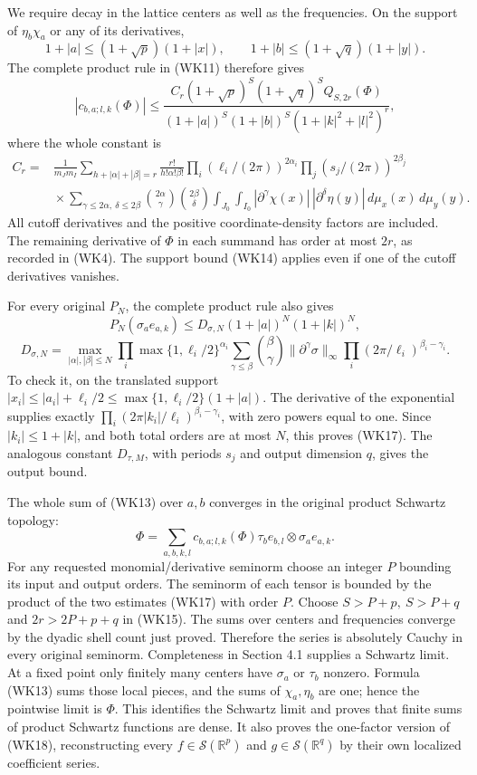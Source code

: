 \documentclass[
  11pt,
]{article}
\begin{document}
We require decay in the lattice centers as well as the frequencies. On
the support of \(\eta_b\chi_a\) or any of its derivatives, \[
 1+|a|\leq(1+\sqrt p)(1+|x|),\qquad
 1+|b|\leq(1+\sqrt q)(1+|y|).
 \tag{WK14}
\] The complete product rule in (WK11) therefore gives \[
 |c_{b,a;l,k}(\Phi)|
 \leq
 \frac{C_r(1+\sqrt p)^S(1+\sqrt q)^S Q_{S,2r}(\Phi)}
 {(1+|a|)^S(1+|b|)^S(1+|k|^2+|l|^2)^r},
 \tag{WK15}
\] where the whole constant is \[
 \begin{aligned}
 C_r={}&\frac1{m_Jm_I}
 \sum_{h+|\alpha|+|\beta|=r}
 \frac{r!}{h!\alpha!\beta!}
 \prod_i(\ell_i/(2\pi))^{2\alpha_i}
 \prod_j(s_j/(2\pi))^{2\beta_j}
 \\
 &{}\times\sum_{\gamma\leq2\alpha,\ \delta\leq2\beta}
 \binom{2\alpha}{\gamma}\binom{2\beta}{\delta}
 \int_{J_0}\int_{I_0}
       |\partial^\gamma\chi(x)|\,|\partial^\delta\eta(y)|
                                \,d\mu_x(x)\,d\mu_y(y).
 \end{aligned}
 \tag{WK16}
\] All cutoff derivatives and the positive coordinate-density factors
are included. The remaining derivative of \(\Phi\) in each summand has
order at most \(2r\), as recorded in (WK4). The support bound (WK14)
applies even if one of the cutoff derivatives vanishes.

For every original \(P_N\), the complete product rule also gives \[
 P_N(\sigma_a e_{a,k})
 \leq D_{\sigma,N}(1+|a|)^N(1+|k|)^N,
\] \[
 D_{\sigma,N}=
 \max_{|\alpha|,|\beta|\leq N}
 \prod_i\max\{1,\ell_i/2\}^{\alpha_i}
 \sum_{\gamma\leq\beta}\binom{\beta}{\gamma}
       \|\partial^\gamma\sigma\|_\infty
       \prod_i(2\pi/\ell_i)^{\beta_i-\gamma_i}.
 \tag{WK17}
\] To check it, on the translated support
\(|x_i|\leq|a_i|+\ell_i/2\leq\max\{1,\ell_i/2\}(1+|a|)\). The derivative
of the exponential supplies exactly
\(\prod_i(2\pi|k_i|/\ell_i)^{\beta_i-\gamma_i}\), with zero powers equal
to one. Since \(|k_i|\leq1+|k|\), and both total orders are at most
\(N\), this proves (WK17). The analogous constant \(D_{\tau,M}\), with
periods \(s_j\) and output dimension \(q\), gives the output bound.

The whole sum of (WK13) over \(a,b\) converges in the original product
Schwartz topology: \[
 \Phi=\sum_{a,b,k,l}c_{b,a;l,k}(\Phi)
                    \tau_b e_{b,l}\otimes\sigma_a e_{a,k}.
 \tag{WK18}
\] For any requested monomial/derivative seminorm choose an integer
\(P\) bounding its input and output orders. The seminorm of each tensor
is bounded by the product of the two estimates (WK17) with order \(P\).
Choose \(S>P+p,\ S>P+q\) and \(2r>2P+p+q\) in (WK15). The sums over
centers and frequencies converge by the dyadic shell count just proved.
Therefore the series is absolutely Cauchy in every original seminorm.
Completeness in Section 4.1 supplies a Schwartz limit. At a fixed point
only finitely many centers have \(\sigma_a\) or \(\tau_b\) nonzero.
Formula (WK13) sums those local pieces, and the sums of
\(\chi_a,\eta_b\) are one; hence the pointwise limit is \(\Phi\). This
identifies the Schwartz limit and proves that finite sums of product
Schwartz functions are dense. It also proves the one-factor version of
(WK18), reconstructing every \(f\in\mathcal S(\mathbb R^p)\) and
\(g\in\mathcal S(\mathbb R^q)\) by their own localized coefficient
series.
\end{document}
